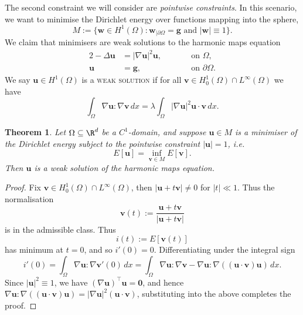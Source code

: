 \documentclass[reqno]{amsart}
\newtheorem{theorem}{Theorem}
\theoremstyle{definition}
\theoremstyle{remark}
\renewcommand{\emph}{\textsc}
\let\vec\mathbf
\begin{document}
The second constraint we will consider are \textit{pointwise constraints}. In this scenario, we want to minimise the Dirichlet energy over functions mapping into the sphere, 
	\[ M := \{ \vec w \in H^1 (\Omega) : \vec w_{|\partial \Omega} =\vec  g \text{ and } |\vec w| \equiv 1 \}. \]
We claim that minimisers are weak solutions to the harmonic maps equation
	\begin{alignat*}{2}
				-\Delta \vec u &= |\nabla \vec u|^2 \vec u, 	& \qquad &\text{on } \Omega, \\
				\vec u &= \vec g, 	&	&\text{on } \partial \Omega.
	\end{alignat*}
	We say $\vec u \in H^1 (\Omega)$ is a \emph{weak solution} if for all $\vec v \in H_0^1 (\Omega) \cap L^\infty (\Omega)$ we have
		\[ \int_\Omega \nabla \vec u : \nabla \vec v \, dx = \lambda \int_\Omega |\nabla\vec u|^2 \vec u \cdot \vec v \, dx .\]
\begin{theorem}
	Let $\Omega \subseteq \R^d$ be a $C^1$-domain, and suppose $\vec u \in M$ is a minimiser of the Dirichlet energy subject to the pointwise constraint $|\vec u| = 1$, i.e.
		\[ E[\vec u] = \inf_{\vec v \in M} E[\vec v]. \] 
	Then $\vec u$ is a weak solution of the harmonic maps equation.
\end{theorem}	

\begin{proof}
	Fix $\vec v \in H^1_0 (\Omega) \cap L^\infty (\Omega)$, then $|\vec u + t \vec v| \neq 0$ for $|t| \ll 1$. Thus the normalisation 
		\[ \vec v (t) := \frac{\vec u + t \vec v}{|\vec u + t \vec v|}  \]
	is in the admissible class. Thus 
		\[  i (t) := E[\vec v(t)]\]
	has minimum at $t = 0$, and so $i'(0) = 0$. Differentiating under the integral sign
		\[  i'(0) = \int_\Omega \nabla \vec u : \nabla \vec v' (0) \, dx = \int_\Omega \nabla \vec u : \nabla \vec v - \nabla \vec u : \nabla ((\vec u \cdot \vec v) \vec u)\,  dx.\]
	Since $|\vec u|^2 \equiv 1$, we have $(\nabla \vec u)^{\top} \vec u = \vec 0$, and hence	$\nabla \vec u : \nabla ((\vec u \cdot \vec v) \vec u) = |\nabla \vec u|^2 (\vec u \cdot \vec v)$, substituting into the above completes the proof. 
\end{proof}
\end{document}
